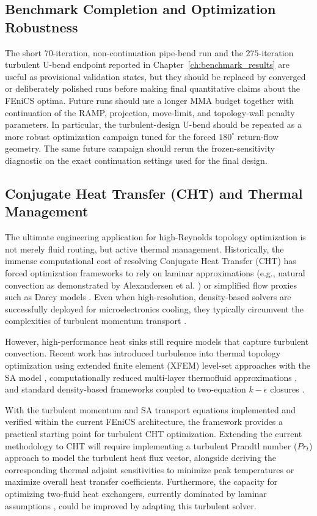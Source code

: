 \subsection{Benchmark Completion and Optimization Robustness}
The short $70$-iteration, non-continuation pipe-bend run and the $275$-iteration turbulent U-bend endpoint reported in Chapter~\ref{ch:benchmark_results} are useful as provisional validation states, but they should be replaced by converged or deliberately polished runs before making final quantitative claims about the FEniCS optima. Future runs should use a longer MMA budget together with continuation of the RAMP, projection, move-limit, and topology-wall penalty parameters. In particular, the turbulent-design U-bend should be repeated as a more robust optimization campaign tuned for the forced $180^\circ$ return-flow geometry. The same future campaign should rerun the frozen-sensitivity diagnostic on the exact continuation settings used for the final design.

\subsection{Conjugate Heat Transfer (CHT) and Thermal Management}
The ultimate engineering application for high-Reynolds topology optimization is not merely fluid routing, but active thermal management. Historically, the immense computational cost of resolving Conjugate Heat Transfer (CHT) has forced optimization frameworks to rely on laminar approximations (e.g., natural convection as demonstrated by Alexandersen et al. \cite{Alexandersen2014}) or simplified flow proxies such as Darcy models \cite{Zhao2018}. Even when high-resolution, density-based solvers are successfully deployed for microelectronics cooling, they typically circumvent the complexities of turbulent momentum transport \cite{Barroca2023}. 

However, high-performance heat sinks still require models that capture turbulent convection. Recent work has introduced turbulence into thermal topology optimization using extended finite element (XFEM) level-set approaches with the SA model \cite{Maute2023}, computationally reduced multi-layer thermofluid approximations \cite{Zhao2021}, and standard density-based frameworks coupled to two-equation $k-\epsilon$ closures \cite{Sun2023}.

With the turbulent momentum and SA transport equations implemented and verified within the current FEniCS architecture, the framework provides a practical starting point for turbulent CHT optimization. Extending the current methodology to CHT will require implementing a turbulent Prandtl number ($Pr_t$) approach to model the turbulent heat flux vector, alongside deriving the corresponding thermal adjoint sensitivities to minimize peak temperatures or maximize overall heat transfer coefficients. Furthermore, the capacity for optimizing two-fluid heat exchangers, currently dominated by laminar assumptions \cite{Andreasen2020}, could be improved by adapting this turbulent solver.

